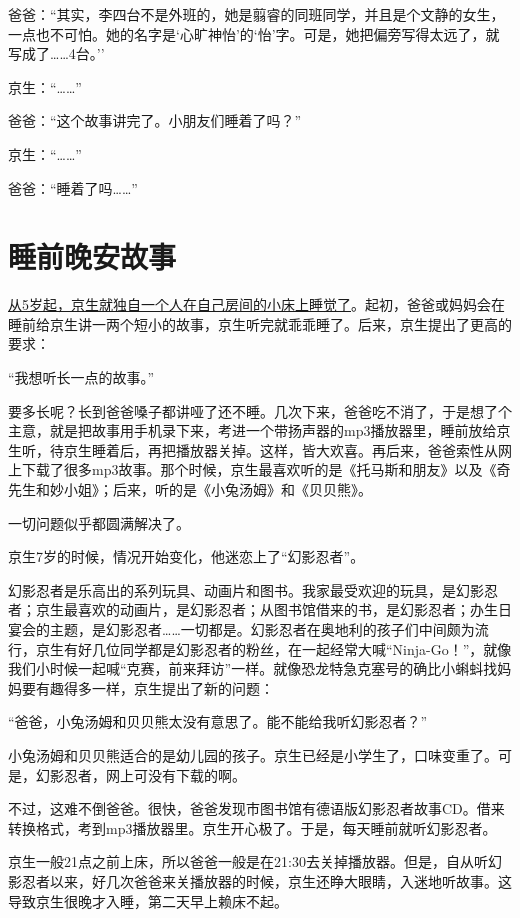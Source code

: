 \documentclass[twoside,openright,headings=optiontohead]{ctexbook} %
\begin{document}
{爸爸：``其实，李四台不是外班的，她是翦睿的同班同学，并且是个文静的女生，一点也不可怕。她的名字是`心旷神怡'的`怡'字。可是，她把偏旁写得太远了，就写成了\ldots{}\ldots{}4台。''

京生：``\ldots{}\ldots{}''

爸爸：``这个故事讲完了。小朋友们睡着了吗？''

京生：``\ldots{}\ldots{}''

爸爸：``睡着了吗\ldots{}\ldots{}''

\chapter*{睡前晚安故事}\label{goodnight-stories}

\href{http://dapengde.com/archives/15538}{从5岁起，京生就独自一个人在自己房间的小床上睡觉了}。起初，爸爸或妈妈会在睡前给京生讲一两个短小的故事，京生听完就乖乖睡了。后来，京生提出了更高的要求：

``我想听长一点的故事。''

要多长呢？长到爸爸嗓子都讲哑了还不睡。几次下来，爸爸吃不消了，于是想了个主意，就是把故事用手机录下来，考进一个带扬声器的mp3播放器里，睡前放给京生听，待京生睡着后，再把播放器关掉。这样，皆大欢喜。再后来，爸爸索性从网上下载了很多mp3故事。那个时候，京生最喜欢听的是《托马斯和朋友》以及《奇先生和妙小姐》；后来，听的是《小兔汤姆》和《贝贝熊》。

一切问题似乎都圆满解决了。

京生7岁的时候，情况开始变化，他迷恋上了``幻影忍者''。

幻影忍者是乐高出的系列玩具、动画片和图书。我家最受欢迎的玩具，是幻影忍者；京生最喜欢的动画片，是幻影忍者；从图书馆借来的书，是幻影忍者；办生日宴会的主题，是幻影忍者\ldots{}\ldots{}一切都是。幻影忍者在奥地利的孩子们中间颇为流行，京生有好几位同学都是幻影忍者的粉丝，在一起经常大喊``Ninja-Go！''，就像我们小时候一起喊``克赛，前来拜访''一样。就像恐龙特急克塞号的确比小蝌蚪找妈妈要有趣得多一样，京生提出了新的问题：

``爸爸，小兔汤姆和贝贝熊太没有意思了。能不能给我听幻影忍者？''

小兔汤姆和贝贝熊适合的是幼儿园的孩子。京生已经是小学生了，口味变重了。可是，幻影忍者，网上可没有下载的啊。

不过，这难不倒爸爸。很快，爸爸发现市图书馆有德语版幻影忍者故事CD。借来转换格式，考到mp3播放器里。京生开心极了。于是，每天睡前就听幻影忍者。

京生一般21点之前上床，所以爸爸一般是在21:30去关掉播放器。但是，自从听幻影忍者以来，好几次爸爸来关播放器的时候，京生还睁大眼睛，入迷地听故事。这导致京生很晚才入睡，第二天早上赖床不起。

}
\end{document}
